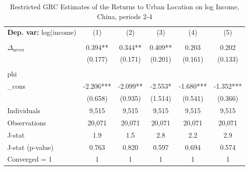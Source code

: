 \begin{table}[htbp] \centering \begin{threeparttable}
 \caption{Restricted GRC Estimates of the Returns to Urban Location on log Income, China, periods 2-4} 
 \label{tab:GRC_CHN234_income_urban_unb} 
\begin{tabular}{l ccccc} \toprule  \textbf{Dep. var:}  log(income) 
                    &\multicolumn{1}{c}{(1)}   &\multicolumn{1}{c}{(2)}   &\multicolumn{1}{c}{(3)}   &\multicolumn{1}{c}{(4)}   &\multicolumn{1}{c}{(5)}   \\
                    &               &               &               &               &               \\
\addlinespace
$\Delta_{\text{never}}$&       0.394** &       0.344** &       0.409** &       0.203   &       0.202   \\
                    &     (0.177)   &     (0.171)   &     (0.201)   &     (0.161)   &     (0.133)   \\
                    &               &               &               &               &               \\
\addlinespace
phi                 &               &               &               &               &               \\
_cons               &      -2.206***&      -2.099** &      -2.553*  &      -1.680***&      -1.352***\\
                    &     (0.658)   &     (0.935)   &     (1.514)   &     (0.541)   &     (0.366)   \\
\addlinespace
Individuals         &       9,515   &       9,515   &       9,515   &       9,515   &       9,515   \\
Observations        &      20,071   &      20,071   &      20,071   &      20,071   &      20,071   \\
J-stat              &         1.9   &         1.5   &         2.8   &         2.2   &         2.9   \\
J-stat (p-value)    &       0.763   &       0.820   &       0.597   &       0.694   &       0.574   \\
Converged = 1       &           1   &           1   &           1   &           1   &           1   \\

\end{tabular}
\end{threeparttable}
\end{table}
